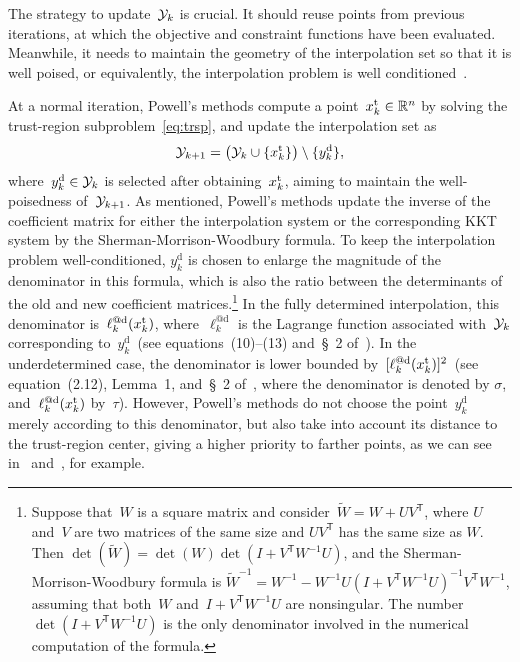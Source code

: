 \documentclass[smallextended]{svjour3}
\newcommand{\set}[2][]{#1\{#2#1\}}
\newcommand{\R}{\mathbb{R}}
\newcommand{\T}{\mathsf{T}}
\newcommand{\drop}{{\text{d}}}
\newcommand{\trust}{{\text{t}}}
\newcommand{\iter}[1][k]{x\ifthenelse{\equal{#1}{}}{}{_{#1}}}
\newcommand{\xpt}[1][k]{\mathcal{Y}\ifthenelse{\equal{#1}{}}{}{_{#1}}}
\newcommand{\modified}[1]{#1}
\begin{document}
The strategy to update~$\xpt$ is crucial.
It should reuse points from previous iterations, at which the objective and constraint functions have been evaluated.
Meanwhile, it needs to maintain the geometry of the interpolation set so that it is well poised, or equivalently, the interpolation problem is well conditioned~\cite{Conn_Scheinberg_Vicente_2009b}.

At a normal iteration, Powell's methods compute a point~$\iter^{\trust} \in \R^n$ by solving the trust-region subproblem~\eqref{eq:trsp}, and update the interpolation set as
\begin{equation}
    \label{eq:xpt-update-tr}
    \xpt[k + 1] = \big(\xpt \cup \set{\iter^{\trust}}\big) \setminus \set{y_k^{\drop}},
\end{equation}
where~$y_k^{\drop} \in \xpt$ is selected after obtaining~$\iter^{\trust}$, aiming to maintain the well-poisedness of~$\xpt[k + 1]$.
As mentioned, Powell's methods update the inverse of the coefficient matrix for either the interpolation system or the corresponding KKT system by the Sherman-Morrison-Woodbury formula.
To keep the interpolation problem well-conditioned, $y_k^{\drop}$ is chosen
to enlarge the magnitude of the denominator in this formula, which is also the ratio between the determinants of the old and new coefficient matrices.\footnote{
    Suppose that~$W$ is a square matrix and consider~$\modified{\widetilde{W}} = W + UV^\T$, where $U$ and~$V$ are two matrices of the same size and $UV^\T$ has the same size as $W$.
    Then $\det(\modified{\widetilde{W}}) = \det(W)\det(I+V^\T W^{-1}U)$, and the Sherman-Morrison-Woodbury formula is $\modified{\widetilde{W}}^{-1} = W^{-1} -W^{-1}U(I+V^\T W^{-1}U)^{-1} V^\T W^{-1}$, assuming that both~$W$ and~$I+V^\T W^{-1}U$ are nonsingular.
    The number~$\det(I+V^\T W^{-1}U)$ is the only denominator involved in the numerical computation of the formula.
}
In the fully determined interpolation, this denominator is~$\ell_k^{@\drop}(\iter^{\trust})$, where~$\ell_k^{@\drop}$ is the Lagrange function associated with~$\xpt$ corresponding to~$y_k^\drop$~(see equations~(10)--(13) and~\S~2 of~\cite{Powell_2001}).
In the underdetermined case, the denominator is lower bounded by~$[\ell_k^{@\drop}(\iter^{\trust})]^2$~(see equation~(2.12), Lemma~1, and~\S~2 of~\cite{Powell_2004c}, where the denominator is denoted by $\sigma$, and~$\ell_k^{@\drop}(\iter^{\trust})$ by~$\tau$).
However, Powell's methods do not choose the point~$y_k^\drop$ merely according to this denominator, but also take into account its distance to the trust-region center, giving a higher priority to farther points, as we can see in~\cite[Equation~(56)]{Powell_2002} and~\cite[Equations~(7.4)--(7.5)]{Powell_2006}, for example.
\end{document}

